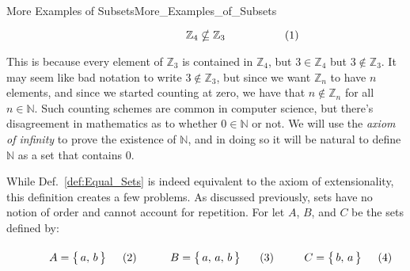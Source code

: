 \begin{lexample}{More Examples of Subsets}{More_Examples_of_Subsets}
\begin{subequations}
                \hfill
                \begin{minipage}[b]{0.49\textwidth}
                    \begin{equation}
                        \mathbb{Z}_{4}\nsubseteq\mathbb{Z}_{3}
                    \end{equation}
                \end{minipage}
            \end{subequations}
            \par\vspace{2.5ex}
            This is because every element of $\mathbb{Z}_{3}$ is contained in
            $\mathbb{Z}_{4}$, but $3\in\mathbb{Z}_{4}$ but
            $3\notin\mathbb{Z}_{3}$. It may seem like bad notation to write
            $3\notin\mathbb{Z}_{3}$, but since we want $\mathbb{Z}_{n}$ to have
            $n$ elements, and since we started counting at zero, we have that
            $n\notin\mathbb{Z}_{n}$ for all $n\in\mathbb{N}$. Such counting
            schemes are common in computer science, but there's disagreement in
            mathematics as to whether $0\in\mathbb{N}$ or not. We will use the
            \textit{axiom of infinity} to prove the
            existence of $\mathbb{N}$, and in doing so it will be natural to
            define $\mathbb{N}$ as a set that contains $0$.
        \end{lexample}
        While Def.~\ref{def:Equal_Sets} is indeed equivalent to the axiom of
        extensionality, this definition creates a few problems. As discussed
        previously, sets have no notion of order and cannot account for
        repetition. For let $A$, $B$, and $C$ be the sets defined by:
        \par
        \begin{subequations}
            \begin{minipage}[b]{0.31\textwidth}
                \begin{equation}
                    A=\big\{\,a,\,b\,\big\}
                \end{equation}
            \end{minipage}
            \hfill
            \begin{minipage}[b]{0.36\textwidth}
                \begin{equation}
                    B=\big\{\,a,\,a,\,b\,\big\}
                \end{equation}
            \end{minipage}
            \hfill
            \begin{minipage}[b]{0.31\textwidth}
                \begin{equation}
                    C=\big\{\,b,\,a\,\big\}
                \end{equation}
            \end{minipage}
        \end{subequations}
